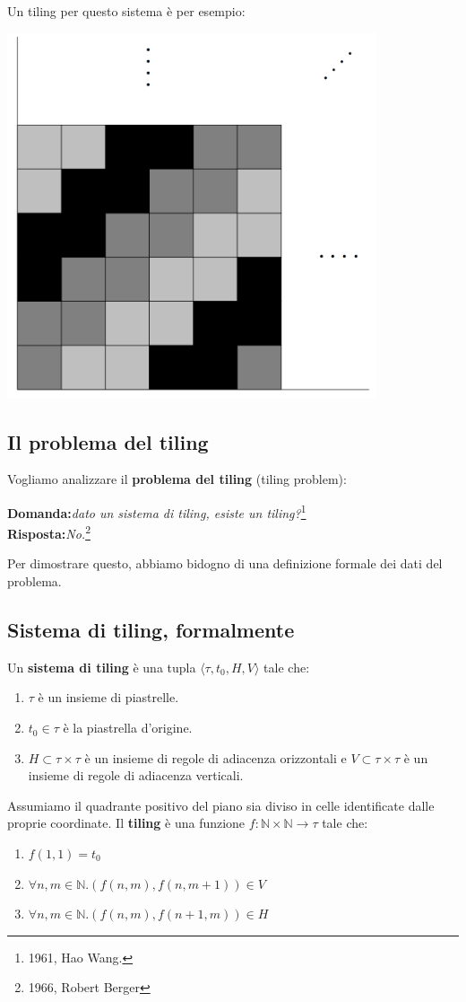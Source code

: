 \documentclass[a4paper, 12pt]{article}
\begin{document}
Un tiling per questo sistema \`e per esempio:
\begin{center}
\includegraphics[scale=0.5]{tiling3.png}
\end{center}
\subsection{Il problema del tiling}
Vogliamo analizzare il \textbf{problema del tiling} (tiling problem):
\begin{center}

\textbf{Domanda:}\emph{dato un sistema di tiling, esiste un tiling?}\footnote{1961, Hao Wang.}\\
\textbf{Risposta:}\emph{No.}\footnote{1966, Robert Berger}
\end{center}
Per dimostrare questo, abbiamo bidogno di una definizione formale dei dati del problema.
\subsection{Sistema di tiling, formalmente}
Un \textbf{sistema di tiling} \`e una tupla $\langle \tau, t_0, H, V \rangle$ tale che:
\begin{center}
\begin{enumerate}
\item $\tau$ \`e un insieme di piastrelle.
\item $t_0 \in \tau$ \`e la piastrella d'origine.
\item $H \subset \tau \times \tau$ \`e un insieme di regole di adiacenza orizzontali e $V \subset \tau \times \tau$ \`e un insieme di regole di adiacenza verticali.
\end{enumerate}
\end{center}
Assumiamo il quadrante positivo del piano sia diviso in celle identificate dalle proprie coordinate. Il \textbf{tiling} \`e una funzione $f: \mathbb{N} \times \mathbb{N} \rightarrow \tau$ tale che:
\begin{enumerate}
\item $f(1,1) = t_0$
\item $\forall n,m \in \mathbb{N}.(f(n,m),f(n,m+1)) \in V$
\item $\forall n,m \in \mathbb{N}.(f(n,m),f(n+1,m)) \in H$
\end{enumerate}
\end{document}
